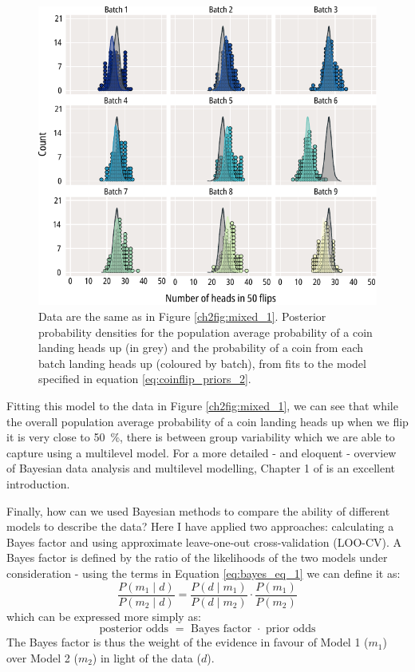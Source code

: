 \begin{figure}
	\centering
	\includegraphics[width=\textwidth]{coinflip_mixed_2.pdf}
	\caption[Multilevel modelling of coinflips - fitting the model]{
		{\bf{}}
		Data are the same as in Figure \ref{ch2fig:mixed_1}.
		Posterior probability densities for the population average probability of a coin landing heads up (in grey) and the probability of a coin from each batch landing heads up (coloured by batch), from fits to the model specified in equation \ref{eq:coinflip_priors_2}.
	}\label{ch2fig:mixed_2}
\end{figure}

Fitting this model to the data in Figure \ref{ch2fig:mixed_1}, we can see that while the overall population average probability of a coin landing heads up when we flip it is very close to \SI{50}{\percent}, there is between group variability which we are able to capture using a multilevel model.
For a more detailed - and eloquent - overview of Bayesian data analysis and multilevel modelling, Chapter 1 of \textcite{mcelreath_statistical_2020} is an excellent introduction.

Finally, how can we used Bayesian methods to compare the ability of different models to describe the data?
Here I have applied two approaches: calculating a Bayes factor and using approximate leave-one-out cross-validation (LOO-CV).
A Bayes factor is defined by the ratio of the likelihoods of the two models under consideration - using the terms in Equation \ref{eq:bayes_eq_1} we can define it as:
\begin{equation}\label{eq:bayes_eq_2}
\frac{P(m_1 \mid d)}{P(m_2 \mid d)} = \frac{P(d \mid m_1)}{P(d \mid m_2)} \cdot \frac{P(m_1)}{P(m_2)}
\end{equation}
which can be expressed more simply as:
\begin{equation*}
\textrm{posterior odds } = \textrm{ Bayes factor } \cdot \textrm{ prior odds}
\end{equation*}
The Bayes factor is thus the weight of the evidence in favour of Model 1 ($m_1$) over Model 2 ($m_2$) in light of the data ($d$).

